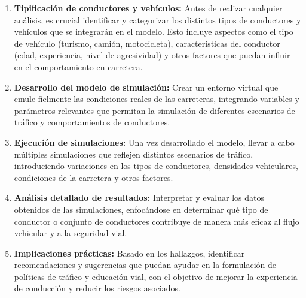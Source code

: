 \begin{enumerate}
    \item \textbf{Tipificación de conductores y vehículos:} Antes de realizar cualquier análisis, es crucial identificar y categorizar los distintos tipos de conductores y vehículos que se integrarán en el modelo. Esto incluye aspectos como el tipo de vehículo (turismo, camión, motocicleta), características del conductor (edad, experiencia, nivel de agresividad) y otros factores que puedan influir en el comportamiento en carretera.
    \item \textbf{Desarrollo del modelo de simulación:} Crear un entorno virtual que emule fielmente las condiciones reales de las carreteras, integrando variables y parámetros relevantes que permitan la simulación de diferentes escenarios de tráfico y comportamientos de conductores.
    \item \textbf{Ejecución de simulaciones:} Una vez desarrollado el modelo, llevar a cabo múltiples simulaciones que reflejen distintos escenarios de tráfico, introduciendo variaciones en los tipos de conductores, densidades vehiculares, condiciones de la carretera y otros factores.
    \item \textbf{Análisis detallado de resultados:} Interpretar y evaluar los datos obtenidos de las simulaciones, enfocándose en determinar qué tipo de conductor o conjunto de conductores contribuye de manera más eficaz al flujo vehicular y a la seguridad vial.
    \item \textbf{Implicaciones prácticas:} Basado en los hallazgos, identificar recomendaciones y sugerencias que puedan ayudar en la formulación de políticas de tráfico y educación vial, con el objetivo de mejorar la experiencia de conducción y reducir los riesgos asociados.
\end{enumerate}